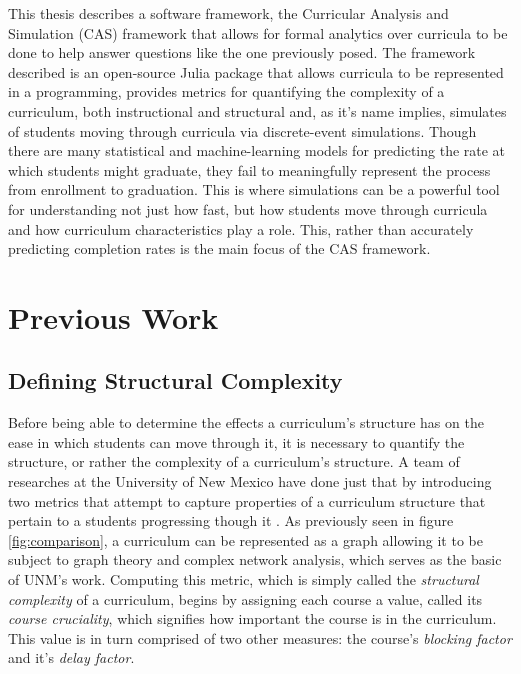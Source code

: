 \documentclass[botnum, fleqn]{unmeethesis}
\begin{document}
  This thesis describes a software framework, the Curricular Analysis and Simulation (CAS) framework that allows for formal analytics over curricula to be done to help answer questions like the one previously posed. The framework described is an open-source Julia package that allows curricula to be represented in a programming, provides metrics for quantifying the complexity of a curriculum, both instructional and structural and, as it's name implies, simulates of students moving through curricula via discrete-event simulations. Though there are many statistical and machine-learning models for predicting the rate at which students might graduate, they fail to meaningfully represent the process from enrollment to graduation. This is where simulations can be a powerful tool for understanding not just how fast, but how students move through curricula and how curriculum characteristics play a role. This, rather than accurately predicting completion rates is the main focus of the CAS framework.


\chapter{Previous Work}

  \section{Defining Structural Complexity}
    Before being able to determine the effects a curriculum's structure has on the ease in which students can move through it, it is necessary to quantify the structure, or rather the complexity of a curriculum's structure. A team of researches at the University of New Mexico have done just that by introducing two metrics that attempt to capture properties of a curriculum structure that pertain to a students progressing though it \cite{complexity}. As previously seen in figure \ref{fig:comparison}, a curriculum can be represented as a graph allowing it to be subject to graph theory and complex network analysis, which serves as the basic of UNM's work. Computing this metric, which is simply called the \textit{structural complexity} of a curriculum, begins by assigning each course a value, called its \textit{course cruciality}, which signifies how important the course is in the curriculum. This value is in turn comprised of two other measures: the course's \textit{blocking factor} and it's \textit{delay factor}.
\end{document}
